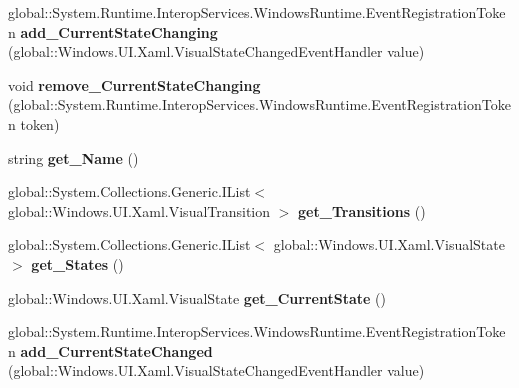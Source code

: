 \begin{DoxyCompactItemize}
global\+::\+System.\+Runtime.\+Interop\+Services.\+Windows\+Runtime.\+Event\+Registration\+Token {\bfseries add\+\_\+\+Current\+State\+Changing} (global\+::\+Windows.\+U\+I.\+Xaml.\+Visual\+State\+Changed\+Event\+Handler value)
\item 
\mbox{\label{interface_windows_1_1_u_i_1_1_xaml_1_1_i_visual_state_group_ac006c519047c6976b91b945fef41af29}} 
void {\bfseries remove\+\_\+\+Current\+State\+Changing} (global\+::\+System.\+Runtime.\+Interop\+Services.\+Windows\+Runtime.\+Event\+Registration\+Token token)
\item 
\mbox{\label{interface_windows_1_1_u_i_1_1_xaml_1_1_i_visual_state_group_aefa260736063a0253bd7b1d360e5dcf0}} 
string {\bfseries get\+\_\+\+Name} ()
\item 
\mbox{\label{interface_windows_1_1_u_i_1_1_xaml_1_1_i_visual_state_group_ac26b8d69e72571edcee2b7ad46c3b2b1}} 
global\+::\+System.\+Collections.\+Generic.\+I\+List$<$ global\+::\+Windows.\+U\+I.\+Xaml.\+Visual\+Transition $>$ {\bfseries get\+\_\+\+Transitions} ()
\item 
\mbox{\label{interface_windows_1_1_u_i_1_1_xaml_1_1_i_visual_state_group_a40eeb37ab129bd4e82ee51c795415b77}} 
global\+::\+System.\+Collections.\+Generic.\+I\+List$<$ global\+::\+Windows.\+U\+I.\+Xaml.\+Visual\+State $>$ {\bfseries get\+\_\+\+States} ()
\item 
\mbox{\label{interface_windows_1_1_u_i_1_1_xaml_1_1_i_visual_state_group_a2994cf852dde78fbd8e46dfff9698768}} 
global\+::\+Windows.\+U\+I.\+Xaml.\+Visual\+State {\bfseries get\+\_\+\+Current\+State} ()
\item 
\mbox{\label{interface_windows_1_1_u_i_1_1_xaml_1_1_i_visual_state_group_ad6ee000116bc2b2c74786dee0efd418c}} 
global\+::\+System.\+Runtime.\+Interop\+Services.\+Windows\+Runtime.\+Event\+Registration\+Token {\bfseries add\+\_\+\+Current\+State\+Changed} (global\+::\+Windows.\+U\+I.\+Xaml.\+Visual\+State\+Changed\+Event\+Handler value)

\end{DoxyCompactItemize}
